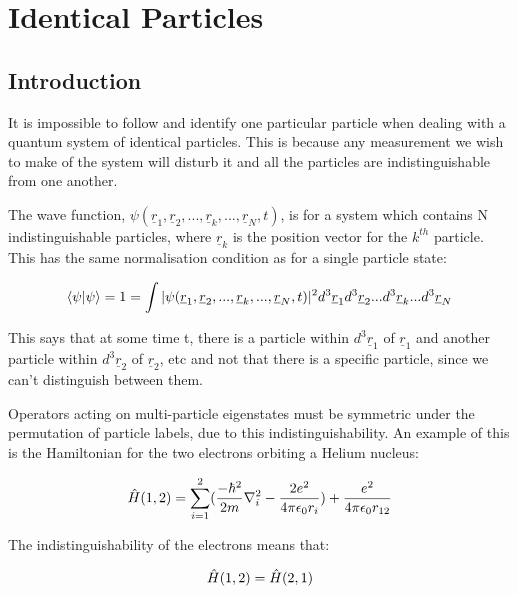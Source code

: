 \chapter{Identical Particles}
\label{chapt5}


\section{Introduction}

It is impossible to follow and identify one particular particle when dealing with a quantum system of identical particles. This is because any measurement we wish to make of the system will disturb it and all the particles are indistinguishable from one another.

\noindent The wave function, $\psi(\underline{r}_1, \underline{r}_2, ..., \underline{r}_k, ..., \underline{r}_N, t)$, is for a system which contains N indistinguishable particles, where $\underline{r}_k$ is the position vector for the $k^{th}$ particle. This has the same normalisation condition as for a single particle state:

\begin{equation}
    \braket{\psi | \psi} = 1 = \int | \psi(\underline{r}_1, \underline{r}_2, ..., \underline{r}_k, ..., \underline{r}_N, t) |^2 d^3\underline{r}_1 d^3\underline{r}_2 ... d^3\underline{r}_k ... d^3\underline{r}_N
    \label{ManyParticleNormalisation}
\end{equation}

\noindent This says that at some time t, there is a particle within $d^3\underline{r}_1$ of $\underline{r}_1$ and another particle within $d^3\underline{r}_2$ of $\underline{r}_2$, etc and not that there is a specific particle, since we can't distinguish between them.

\noindent Operators acting on multi-particle eigenstates must be symmetric under the permutation of particle labels, due to this indistinguishability. An example of this is the Hamiltonian for the two electrons orbiting a Helium nucleus:

\begin{equation}
    \Hat{H}(1, 2) = \sum_{i=1}^2 (\frac{-\hbar^2}{2m}\nabla^2_i - \frac{2e^2}{4 \pi \epsilon_0 r_i}) + \frac{e^2}{4 \pi \epsilon_0 r_{12}}
    \label{HeliumAtomHamiltonian}
\end{equation}

\noindent The indistinguishability of the electrons means that:

\begin{equation}
    \Hat{H}(1, 2) = \Hat{H}(2, 1)
    \label{ExchangeDegeneracy}
\end{equation}

